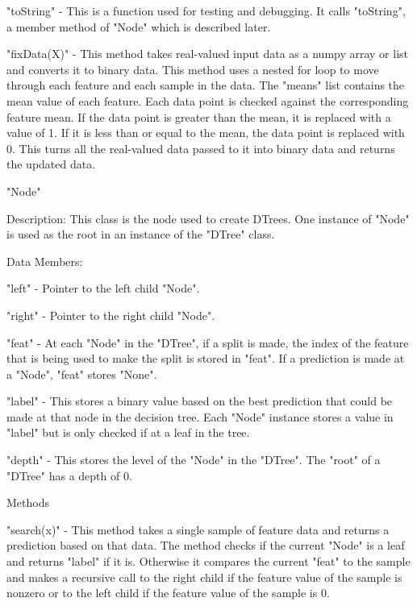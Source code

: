 \documentclass{article}
\begin{document}
\indent \textbullet "toString" - This is a function used for testing and debugging. It calls "toString", a member method of "Node" which is described later.

\indent \textbullet "fixData(X)" - This method takes real-valued input data as a numpy array or list and converts it to binary data. This method uses a nested for loop to move through each feature and each sample in the data. The "means" list contains the mean value of each feature. Each data point is checked against the corresponding feature mean. If the data point is greater than the mean, it is replaced with a value of 1. If it is less than or equal to the mean, the data point is replaced with 0. This turns all the real-valued data passed to it into binary data and returns the updated data. 

\pagebreak

\noindent "Node"

\indent Description: This class is the node used to create DTrees. One instance of "Node" is used as the root in an instance of the "DTree" class. 

\indent Data Members:

\indent \textbullet "left" - Pointer to the left child "Node".

\indent \textbullet "right" - Pointer to the right child "Node".

\indent \textbullet "feat" - At each "Node" in the "DTree", if a split is made, the index of the feature that is being used to make the split is stored in "feat". If a prediction is made at a "Node", "feat" stores "None".

\indent \textbullet "label" - This stores a binary value based on the best prediction that could be made at that node in the decision tree. Each "Node" instance stores a value in "label" but is only checked if at a leaf in the tree.

\indent \textbullet "depth" - This stores the level of the "Node" in the "DTree". The "root" of a "DTree" has a depth of 0.

\indent Methods

\indent \textbullet "search(x)" - This method takes a single sample of feature data and returns a prediction based on that data. The method checks if the current "Node" is a leaf and returns "label" if it is. Otherwise it compares the current "feat" to the sample and makes a recursive call to the right child if the feature value of the sample is nonzero or to the left child if the feature value of the sample is 0.
\end{document}
